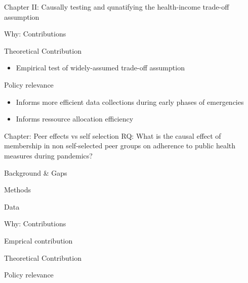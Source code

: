 \documentclass[
  ignorenonframetext,
]{beamer}
\providecommand{\tightlist}{%
  \setlength{\itemsep}{0pt}\setlength{\parskip}{0pt}}\usepackage{longtable,booktabs,array}
\begin{document}
\begin{frame}[fragile]{Chapter II: Causally testing and qunatifying the
health-income trade-off assumption}
\begin{block}{Why: Contributions}
\begin{block}{Theoretical Contribution}
\label{theoretical-contribution-1}
\begin{itemize}
\tightlist
\item
  Empirical test of widely-assumed trade-off assumption
\end{itemize}
\end{block}

\begin{block}{Policy relevance}
\label{policy-relevance-1}
\begin{itemize}
\tightlist
\item
  Informs more efficient data collections during early phases of
  emergencies
\item
  Informs ressource allocation efficiency
\end{itemize}
\end{block}
\end{block}
\end{frame}

\begin{frame}{Chapter: Peer effects vs self selection}
\label{chapter-peer-effects-vs-self-selection}
RQ: What is the causal effect of membership in non self-selected peer
groups on adherence to public health measures during pandemics?

\begin{block}{Background \& Gaps}
\label{background-gaps-2}
\end{block}

\begin{block}{Methods}
\label{methods-1}
\end{block}

\begin{block}{Data}
\label{data-2}
\end{block}

\begin{block}{Why: Contributions}
\label{why-contributions-2}
\begin{block}{Emprical contribution}
\label{emprical-contribution-2}
\end{block}

\begin{block}{Theoretical Contribution}
\label{theoretical-contribution-2}
\end{block}

\begin{block}{Policy relevance}
\label{policy-relevance-2}
\end{block}
\end{block}
\end{frame}
\end{document}
